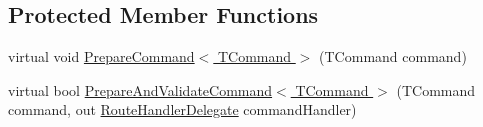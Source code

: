 \subsection*{Protected Member Functions}
\begin{DoxyCompactItemize}
\item 
virtual void \hyperlink{classCqrs_1_1Bus_1_1InProcessBus_ab0064808b1b619bee57fa5eff49bfca7_ab0064808b1b619bee57fa5eff49bfca7}{Prepare\+Command$<$ T\+Command $>$} (T\+Command command)
\item 
virtual bool \hyperlink{classCqrs_1_1Bus_1_1InProcessBus_a603950d39c407d5b9661dc0937fa67cc_a603950d39c407d5b9661dc0937fa67cc}{Prepare\+And\+Validate\+Command$<$ T\+Command $>$} (T\+Command command, out \hyperlink{classCqrs_1_1Bus_1_1RouteHandlerDelegate}{Route\+Handler\+Delegate} command\+Handler)
\end{DoxyCompactItemize}

